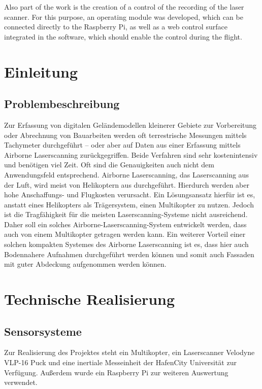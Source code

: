 \documentclass[a4paper,12pt,bibliography=totoc, listof=totoc,titlepage]{scrreprt}
\begin{document}
Also part of the work is the creation of a control of the recording of the laser scanner. For this purpose, an operating module was developed, which can be connected directly to the Raspberry Pi, as well as a web control surface integrated in the software, which should enable the control during the flight.
\newpage

\tableofcontents
\newpage

\setcounter{page}{1} 

\chapter{Einleitung}

\section{Problembeschreibung}
Zur Erfassung von digitalen Geländemodellen kleinerer Gebiete zur Vorbereitung oder Abrechnung von Bauarbeiten werden oft terrestrische Messungen mittels Tachymeter durchgeführt -- oder aber auf Daten aus einer Erfassung mittels Airborne Laserscanning zurückgegriffen. Beide Verfahren sind sehr kostenintensiv und benötigen viel Zeit. Oft sind die Genauigkeiten auch nicht dem Anwendungsfeld entsprechend. Airborne Laserscanning, das Laserscanning aus der Luft, wird meist von Helikoptern aus durchgeführt. Hierdurch werden aber hohe Anschaffungs- und Flugkosten verursacht. Ein Lösungsansatz hierfür ist es, anstatt eines Helikopters als Trägersystem, einen Multikopter zu nutzen. Jedoch ist die Tragfähigkeit für die meisten Laserscanning-Systeme nicht ausreichend. Daher soll ein solches Airborne-Laserscanning-System entwickelt werden, dass auch von einem Multikopter getragen werden kann. Ein weiterer Vorteil einer solchen kompakten Systemes des Airborne Laserscanning ist es, dass hier auch Bodennahere Aufnahmen durchgeführt werden können und somit auch Fassaden mit guter Abdeckung aufgenommen werden können.

\chapter{Technische Realisierung}


\section{Sensorsysteme}
Zur Realisierung des Projektes steht ein Multikopter, ein Laserscanner Velodyne VLP-16 Puck und eine inertiale Messeinheit der HafenCity Universität zur Verfügung. Außerdem wurde ein Raspberry Pi zur weiteren Auswertung verwendet.
\end{document}
